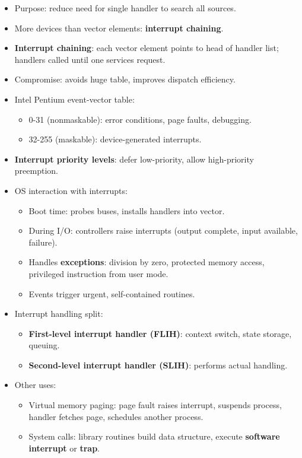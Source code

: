 \begin{itemize}
    \item Purpose: reduce need for single handler to search all sources.
    \item More devices than vector elements: \textbf{interrupt chaining}.
    \item \textbf{Interrupt chaining}: each vector element points to head of handler list; handlers called until one services request.
    \item Compromise: avoids huge table, improves dispatch efficiency.
    \item Intel Pentium event-vector table:
    \begin{itemize}
        \item 0-31 (nonmaskable): error conditions, page faults, debugging.
        \item 32-255 (maskable): device-generated interrupts.
    \end{itemize}
    \item \textbf{Interrupt priority levels}: defer low-priority, allow high-priority preemption.
    \item OS interaction with interrupts:
    \begin{itemize}
        \item Boot time: probes buses, installs handlers into vector.
        \item During I/O: controllers raise interrupts (output complete, input available, failure).
        \item Handles \textbf{exceptions}: division by zero, protected memory access, privileged instruction from user mode.
        \item Events trigger urgent, self-contained routines.
    \end{itemize}
    \item Interrupt handling split:
    \begin{itemize}
        \item \textbf{First-level interrupt handler (FLIH)}: context switch, state storage, queuing.
        \item \textbf{Second-level interrupt handler (SLIH)}: performs actual handling.
    \end{itemize}
    \item Other uses:
    \begin{itemize}
        \item Virtual memory paging: page fault raises interrupt, suspends process, handler fetches page, schedules another process.
        \item System calls: library routines build data structure, execute \textbf{software interrupt} or \textbf{trap}.

\end{itemize}
\end{itemize}
